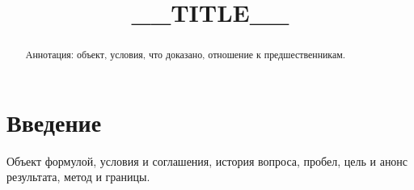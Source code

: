 \documentclass[12pt,a4paper]{article}
\title{__TITLE__}
\author{}
\date{}
\theoremstyle{definition}
\begin{document}
\maketitle
\begin{abstract}
Аннотация: объект, условия, что доказано, отношение к предшественникам.
\end{abstract}

\section{Введение}
Объект формулой, условия и соглашения, история вопроса, пробел, цель и анонс результата,
метод и границы.
\end{document}
